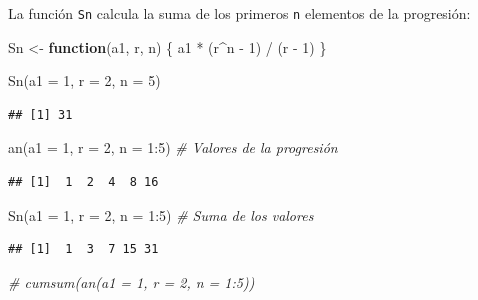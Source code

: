 \documentclass[
]{book}
\newenvironment{Shaded}{\begin{snugshade}}{\end{snugshade}}
\newcommand{\AttributeTok}[1]{\textcolor[rgb]{0.77,0.63,0.00}{#1}}
\newcommand{\CommentTok}[1]{\textcolor[rgb]{0.56,0.35,0.01}{\textit{#1}}}
\newcommand{\ControlFlowTok}[1]{\textcolor[rgb]{0.13,0.29,0.53}{\textbf{#1}}}
\newcommand{\DecValTok}[1]{\textcolor[rgb]{0.00,0.00,0.81}{#1}}
\newcommand{\FunctionTok}[1]{\textcolor[rgb]{0.00,0.00,0.00}{#1}}
\newcommand{\NormalTok}[1]{#1}
\newcommand{\OtherTok}[1]{\textcolor[rgb]{0.56,0.35,0.01}{#1}}
\newcommand{\SpecialCharTok}[1]{\textcolor[rgb]{0.00,0.00,0.00}{#1}}
\theoremstyle{break}
\theoremstyle{nonumberplain}
\begin{document}
La función \texttt{Sn} calcula la suma de los primeros \texttt{n}
elementos de la progresión:

\begin{Shaded}
\begin{Highlighting}[]
\NormalTok{Sn }\OtherTok{\textless{}{-}} \ControlFlowTok{function}\NormalTok{(a1, r, n) \{}
\NormalTok{        a1 }\SpecialCharTok{*}\NormalTok{ (r}\SpecialCharTok{\^{}}\NormalTok{n }\SpecialCharTok{{-}} \DecValTok{1}\NormalTok{) }\SpecialCharTok{/}\NormalTok{ (r }\SpecialCharTok{{-}} \DecValTok{1}\NormalTok{)}
\NormalTok{      \}}
  
\FunctionTok{Sn}\NormalTok{(}\AttributeTok{a1 =} \DecValTok{1}\NormalTok{, }\AttributeTok{r =} \DecValTok{2}\NormalTok{, }\AttributeTok{n =} \DecValTok{5}\NormalTok{)}
\end{Highlighting}
\end{Shaded}

\begin{verbatim}
## [1] 31
\end{verbatim}

\begin{Shaded}
\begin{Highlighting}[]
\FunctionTok{an}\NormalTok{(}\AttributeTok{a1 =} \DecValTok{1}\NormalTok{, }\AttributeTok{r =} \DecValTok{2}\NormalTok{, }\AttributeTok{n =} \DecValTok{1}\SpecialCharTok{:}\DecValTok{5}\NormalTok{)    }\CommentTok{\# Valores de la progresión}
\end{Highlighting}
\end{Shaded}

\begin{verbatim}
## [1]  1  2  4  8 16
\end{verbatim}

\begin{Shaded}
\begin{Highlighting}[]
\FunctionTok{Sn}\NormalTok{(}\AttributeTok{a1 =} \DecValTok{1}\NormalTok{, }\AttributeTok{r =} \DecValTok{2}\NormalTok{, }\AttributeTok{n =} \DecValTok{1}\SpecialCharTok{:}\DecValTok{5}\NormalTok{)    }\CommentTok{\# Suma de los valores}
\end{Highlighting}
\end{Shaded}

\begin{verbatim}
## [1]  1  3  7 15 31
\end{verbatim}

\begin{Shaded}
\begin{Highlighting}[]
\CommentTok{\# cumsum(an(a1 = 1, r = 2, n = 1:5))}
\end{Highlighting}
\end{Shaded}
\end{document}
